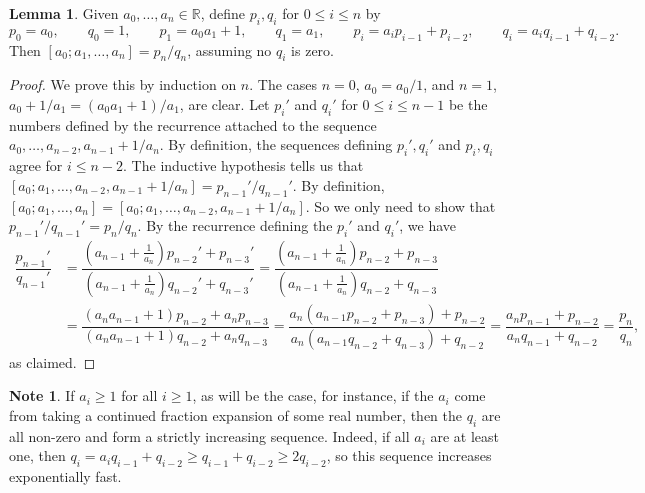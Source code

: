 \documentclass{article}
\newcommand{\R}{\mathbb{R}}
\newcommand{\rb}[1]{\left( #1 \right)}
\renewcommand{\sb}[1]{\left[ #1 \right]}
\theoremstyle{definition}\newtheorem{definition}{Definition}
\theoremstyle{definition}\newtheorem{remark}[definition]{Remark}
\theoremstyle{definition}\newtheorem*{example}{Example}
\theoremstyle{definition}\newtheorem*{note}{Note}
\newtheorem{lemma}[definition]{Lemma}
\begin{document}
\begin{lemma}
\label{lem:68}
Given $ a_0, \dots, a_n \in \R $, define $ p_i, q_i $ for $ 0 \le i \le n $ by
$$ p_0 = a_0, \qquad q_0 = 1, \qquad p_1 = a_0a_1 + 1, \qquad q_1 = a_1, \qquad p_i = a_ip_{i - 1} + p_{i - 2}, \qquad q_i = a_iq_{i - 1} + q_{i - 2}. $$
Then $ \sb{a_0; a_1, \dots, a_n} = p_n / q_n $, assuming no $ q_i $ is zero.
\end{lemma}

\begin{proof}
We prove this by induction on $ n $. The cases $ n = 0 $, $ a_0 = a_0 / 1 $, and $ n = 1 $, $ a_0 + 1 / a_1 = \rb{a_0a_1 + 1} / a_1 $, are clear. Let $ p_i' $ and $ q_i' $ for $ 0 \le i \le n - 1 $ be the numbers defined by the recurrence attached to the sequence $ a_0, \dots, a_{n - 2}, a_{n - 1} + 1 / a_n $. By definition, the sequences defining $ p_i', q_i' $ and $ p_i, q_i $ agree for $ i \le n - 2 $. The inductive hypothesis tells us that $ \sb{a_0; a_1, \dots, a_{n - 2}, a_{n - 1} + 1 / a_n} = p_{n - 1}' / q_{n - 1}' $. By definition, $ \sb{a_0; a_1, \dots, a_n} = \sb{a_0; a_1, \dots, a_{n - 2}, a_{n - 1} + 1 / a_n} $. So we only need to show that $ p_{n - 1}' / q_{n - 1}' = p_n / q_n $. By the recurrence defining the $ p_i' $ and $ q_i' $, we have
\begin{align*}
\dfrac{p_{n - 1}'}{q_{n - 1}'}
& = \dfrac{\rb{a_{n - 1} + \tfrac{1}{a_n}}p_{n - 2}' + p_{n - 3}'}{\rb{a_{n - 1} + \tfrac{1}{a_n}}q_{n - 2}' + q_{n - 3}'}
= \dfrac{\rb{a_{n - 1} + \tfrac{1}{a_n}}p_{n - 2} + p_{n - 3}}{\rb{a_{n - 1} + \tfrac{1}{a_n}}q_{n - 2} + q_{n - 3}} \\
& = \dfrac{\rb{a_na_{n - 1} + 1}p_{n - 2} + a_np_{n - 3}}{\rb{a_na_{n - 1} + 1}q_{n - 2} + a_nq_{n - 3}}
= \dfrac{a_n\rb{a_{n - 1}p_{n - 2} + p_{n - 3}} + p_{n - 2}}{a_n\rb{a_{n - 1}q_{n - 2} + q_{n - 3}} + q_{n - 2}}
= \dfrac{a_np_{n - 1} + p_{n - 2}}{a_nq_{n - 1} + q_{n - 2}}
= \dfrac{p_n}{q_n},
\end{align*}
as claimed.
\end{proof}

\begin{note}
If $ a_i \ge 1 $ for all $ i \ge 1 $, as will be the case, for instance, if the $ a_i $ come from taking a continued fraction expansion of some real number, then the $ q_i $ are all non-zero and form a strictly increasing sequence. Indeed, if all $ a_i $ are at least one, then $ q_i = a_iq_{i - 1} + q_{i - 2} \ge q_{i - 1} + q_{i - 2} \ge 2q_{i - 2} $, so this sequence increases exponentially fast.
\end{note}
\end{document}
